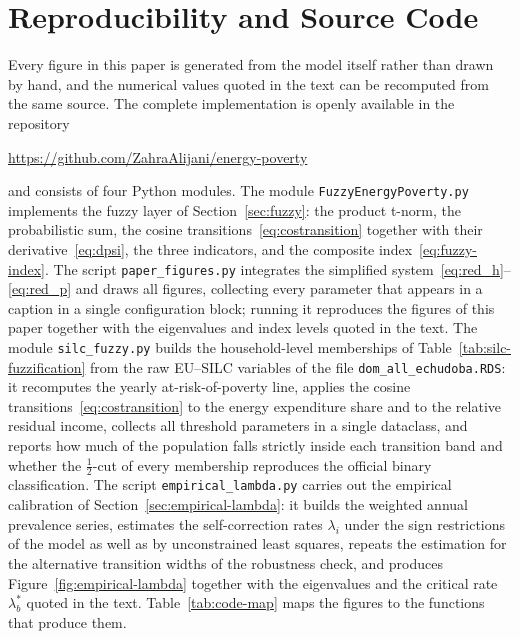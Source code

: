 \documentclass[11pt,a4paper]{article}
\newcommand{\codeurl}{https://github.com/ZahraAlijani/energy-poverty}
\begin{document}


\appendix
\section{Reproducibility and Source Code}\label{app:code}

Every figure in this paper is generated from the model itself rather than drawn
by hand, and the numerical values quoted in the text can be recomputed from the
same source. The complete implementation is openly available in the repository
\begin{center}
\url{\codeurl}
\end{center}
and consists of four Python modules. The module \texttt{FuzzyEnergyPoverty.py}
implements the fuzzy layer of Section~\ref{sec:fuzzy}: the product t-norm, the
probabilistic sum, the cosine transitions~\eqref{eq:costransition} together with
their derivative~\eqref{eq:dpsi}, the three indicators, and the composite
index~\eqref{eq:fuzzy-index}. The script \texttt{paper\_figures.py} integrates
the simplified system~\eqref{eq:red_h}--\eqref{eq:red_p} and draws all figures,
collecting every parameter that appears in a caption in a single configuration
block; running it reproduces the figures of this paper together with the
eigenvalues and index levels quoted in the text. The module
\texttt{silc\_fuzzy.py} builds the household-level memberships of
Table~\ref{tab:silc-fuzzification} from the raw EU--SILC variables of the file
\texttt{dom\_all\_echudoba.RDS}: it recomputes the yearly at-risk-of-poverty
line, applies the cosine transitions~\eqref{eq:costransition} to the energy
expenditure share and to the relative residual income, collects all threshold
parameters in a single dataclass, and reports how much of the population falls
strictly inside each transition band and whether the $\tfrac12$-cut of every
membership reproduces the official binary classification. The script
\texttt{empirical\_lambda.py} carries out the empirical calibration of
Section~\ref{sec:empirical-lambda}: it builds the weighted annual prevalence
series, estimates the self-correction rates $\lambda_i$ under the sign
restrictions of the model as well as by unconstrained least squares, repeats the
estimation for the alternative transition widths of the robustness check, and
produces Figure~\ref{fig:empirical-lambda} together with the eigenvalues and the
critical rate $\lambda_b^*$ quoted in the text.
Table~\ref{tab:code-map} maps the figures to the functions that produce them.
\end{document}
